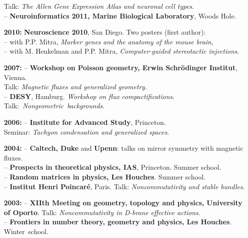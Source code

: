 \documentclass[a4paper, 12pt]{scrartcl}
\newcommand{\confSpace}{\vspace{-0.25in}}
\begin{document}
\begin{list}{name}{ 8em \leftmargin .606 in \itemsep 0.01in}
Talk: {\em{The Allen Gene Expression Atlas and neuronal cell types}}.\\
-- {\bf Neuroinformatics 2011, Marine Biological Laboratory}, Woods Hole.\\ 
\confSpace
                       \item [\bf 2010: ] {\bf Neuroscience 2010}, San Diego. Two posters (first author):\\
 -- with P.P. Mitra, {\em Marker genes and the anatomy of the mouse brain},\\
 -- with M. Henkelman and P.P. Mitra, {\em Computer-guided stereotactic injections}.\\
\confSpace
\item [\bf 2007: ]
  -- {\bf Workshop on Poisson geometry, Erwin Schr\"odinger Institut}, Vienna.\\
    Talk: {\em Magnetic fluxes and generalized geometry}.\\
  -- {\bf DESY}, Hamburg. {\em Workshop on flux compactifications}.\\
        {\hbox{Talk: {\em Nongeometric backgrounds}}}.\\
\confSpace
\item [\bf 2006: ]
  -- {\bf Institute for Advanced Study}, Princeton.\\
     Seminar: {\em Tachyon condensation and generalized spaces}.\\
\confSpace
\item [\bf 2004: ]
  -- {\bf Caltech, Duke} and {\bf  Upenn}: talks on mirror symmetry with magnetic fluxes.\\
  -- {\bf Prospects in theoretical physics, IAS}, Princeton. Summer school.\\ 
  -- {\bf Random matrices in physics,  Les Houches}. Summer school.\\
  -- {\bf Institut Henri Poincar\'e}, Paris. Talk: {\em Noncommutativity and stable bundles}.\\
\confSpace
\item [\bf 2003: ]
  -- {\bf XIIth Meeting on geometry, topology and physics, University of Oporto}. Talk: {\em Noncommutativity in D-brane effective actions}.\\
  -- {\bf  Frontiers in number theory, geometry and physics, Les Houches}.\\ 
       {\hbox{Winter school}}.\\ 
\end{list}
\vspace {-0.4in}
\end{document}
